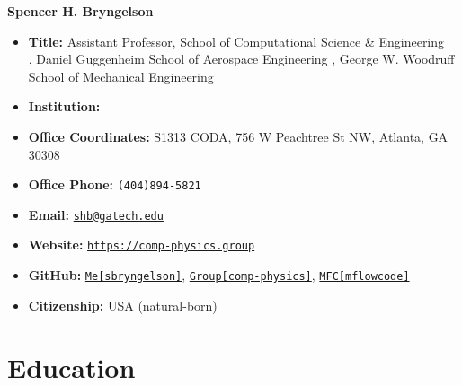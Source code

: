 




\begin{center}
    {\LARGE \bf Spencer H. Bryngelson} 
\end{center}

\begin{itemize}
    \item[] \textbf{Title:} Assistant Professor, School of Computational Science \& Engineering \\
         \APBC, Daniel Guggenheim School of Aerospace Engineering 
         \APBC, George W. Woodruff School of Mechanical Engineering
    \item[] \textbf{Institution:} \GIT
    \item[] \textbf{Office Coordinates:} S1313 CODA, 756 W Peachtree St NW, Atlanta, GA 30308
    \item[] \textbf{Office Phone:} \texttt{(404)894-5821}
    \item[] \textbf{Email:} \href{mailto:shb@gatech.edu}{\texttt{shb@gatech.edu}}
    \item[] \textbf{Website:} \href{https://comp-physics.group}{\texttt{https://comp-physics.group}}
    \item[] \textbf{GitHub:}
        \href{https://github.com/sbryngelson}{\tt Me[sbryngelson]}, 
        \href{https://github.com/comp-physics}{\tt Group[comp-physics]}, 
        \href{https://github.com/mflowcode}{\tt MFC[mflowcode]}
    \item[] \textbf{Citizenship:} USA (natural-born)
\end{itemize}

\vspace{-0.25cm}

\begingroup
\hypersetup{linkcolor=darkrust}    %
\begin{spacing}{0.89}
\setlength{\cftbeforesecskip}{1.5pt} 
\tableofcontents
\end{spacing}
\endgroup

\section{Education}


